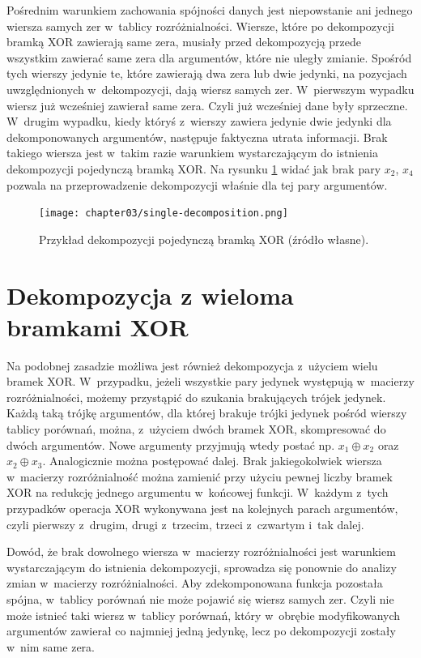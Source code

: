 Pośrednim warunkiem zachowania spójności danych jest niepowstanie ani jednego wiersza samych zer w~tablicy rozróżnialności.
Wiersze,
które po dekompozycji bramką XOR zawierają same zera,
musiały przed dekompozycją przede wszystkim zawierać same zera dla argumentów,
które nie uległy zmianie.
Spośród tych wierszy jedynie te,
które zawierają dwa zera lub dwie jedynki,
na pozycjach uwzględnionych w~dekompozycji,
dają wiersz samych zer.
W~pierwszym wypadku wiersz już wcześniej zawierał same zera.
Czyli już wcześniej dane były sprzeczne.
W~drugim wypadku,
kiedy któryś z~wierszy zawiera jedynie dwie jedynki dla dekomponowanych argumentów,
następuje faktyczna utrata informacji.
Brak takiego wiersza jest w~takim razie warunkiem wystarczającym do istnienia dekompozycji pojedynczą bramką XOR.
Na rysunku \ref{fig:single-decomposition} widać jak brak pary $x_2$, $x_4$ pozwala na przeprowadzenie dekompozycji właśnie dla tej pary argumentów.

\begin{figure}[H]
\centering
\texttt{[image: chapter03/single-decomposition.png]}
\caption{Przykład dekompozycji pojedynczą bramką XOR (źródło własne).}
\label{fig:single-decomposition}
\end{figure}

\section{Dekompozycja z wieloma bramkami XOR}

Na podobnej zasadzie możliwa jest również dekompozycja z~użyciem wielu bramek XOR.
W~przypadku,
jeżeli wszystkie pary jedynek występują w~macierzy rozróżnialności,
możemy przystąpić do szukania brakujących trójek jedynek.
Każdą taką trójkę argumentów,
dla której brakuje trójki jedynek pośród wierszy tablicy porównań,
można, z~użyciem dwóch bramek XOR,
skompresować do dwóch argumentów.
Nowe argumenty przyjmują wtedy postać np. $x_1 \oplus x_2$ oraz $x_2 \oplus x_3$.
Analogicznie można postępować dalej.
Brak jakiegokolwiek wiersza w~macierzy rozróżnialność można zamienić przy użyciu pewnej liczby bramek XOR na redukcję jednego argumentu w~końcowej funkcji.
W~każdym z~tych przypadków operacja XOR wykonywana jest na kolejnych parach argumentów,
czyli pierwszy z~drugim,
drugi z~trzecim,
trzeci z~czwartym i~tak dalej.

Dowód,
że brak dowolnego wiersza w~macierzy rozróżnialności jest warunkiem wystarczającym do istnienia dekompozycji,
sprowadza się ponownie do analizy zmian w~macierzy rozróżnialności.
Aby zdekomponowana funkcja pozostała spójna,
w~tablicy porównań nie może pojawić się wiersz samych zer.
Czyli nie może istnieć taki wiersz w~tablicy porównań,
który w~obrębie modyfikowanych argumentów zawierał co najmniej jedną jedynkę,
lecz po dekompozycji zostały w~nim same zera.

